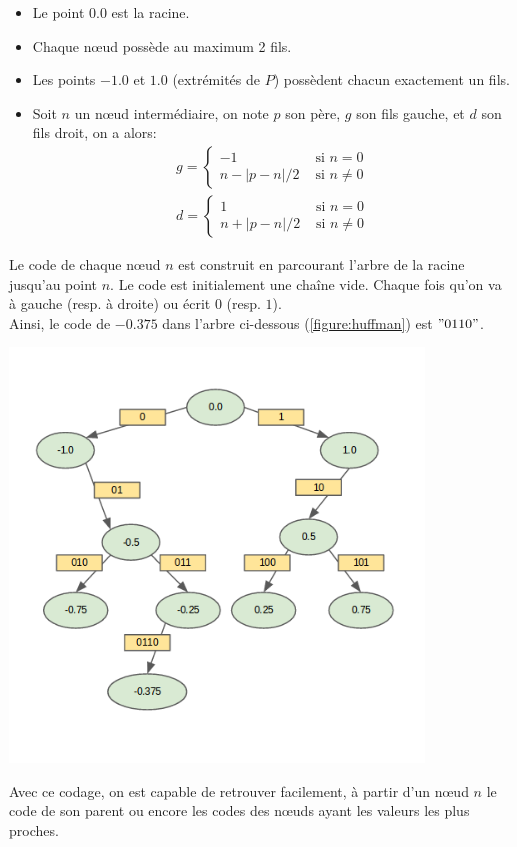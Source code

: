 \begin{itemize}
\begin{itemize}
\item Le point $0.0$ est la racine.
\item Chaque nœud possède au maximum 2 fils.
\item Les points $-1.0$ et $1.0$ (extrémités de $P$) possèdent chacun exactement un fils.
\item Soit $n$ un nœud intermédiaire, on note $p$ son père, $g$ son fils gauche, et $d$ son fils droit, on a alors:
\begin{align}
g =
\begin{cases}
 -1 & \text{ si } n=0 \\
 n-\left | p-n \right |/2 & \text{ si } n\neq0
\end{cases} \nonumber
\\
d =
\begin{cases}
 1 & \text{ si } n=0 \\
 n+\left | p-n \right |/2 & \text{ si } n\neq0
\end{cases} \nonumber
\end{align}
\end{itemize}
Le code de chaque nœud $n$ est construit en parcourant l'arbre de la racine jusqu'au point $n$. Le code est initialement une chaîne vide. Chaque fois qu'on va à gauche (resp. à droite) ou écrit $0$ (resp. $1$).\\
Ainsi, le code de $-0.375$ dans l'arbre ci-dessous (\ref{figure:huffman}) est $"0110"$.\\
\begin{center}
\includegraphics[height= 11cm,width = 11cm]{images/huffman.png}
\label{figure:huffman}
\end{center}
Avec ce codage, on est capable de retrouver facilement, à partir d'un nœud $n$ le code de son parent ou encore les codes des nœuds ayant les valeurs les plus proches.\\


\end{itemize}
